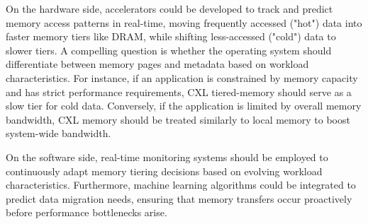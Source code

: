 On the hardware side, accelerators could be developed to track and predict memory access patterns in real-time, moving frequently accessed ("hot") data into faster memory tiers like DRAM, while shifting less-accessed ("cold") data to slower tiers. A compelling question is whether the operating system should differentiate between memory pages and metadata based on workload characteristics. For instance, if an application is constrained by memory capacity and has strict performance requirements, CXL tiered-memory should serve as a slow tier for cold data. Conversely, if the application is limited by overall memory bandwidth, CXL memory should be treated similarly to local memory to boost system-wide bandwidth.

On the software side, real-time monitoring systems should be employed to continuously adapt memory tiering decisions based on evolving workload characteristics. Furthermore, machine learning algorithms could be integrated to predict data migration needs, ensuring that memory transfers occur proactively before performance bottlenecks arise.









